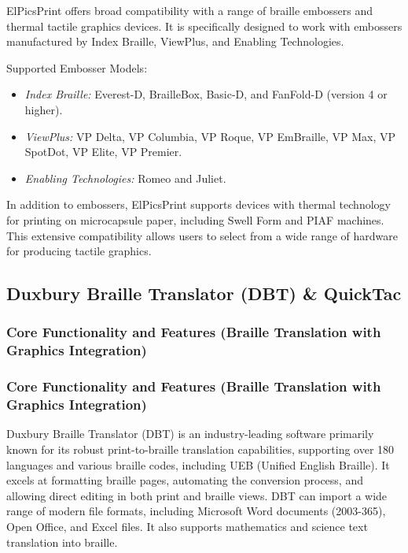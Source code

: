ElPicsPrint offers broad compatibility with a range of braille embossers and thermal tactile graphics devices. It is specifically designed to work with embossers manufactured by Index Braille, ViewPlus, and Enabling Technologies. \cite{TactileViewIrie}

Supported Embosser Models:
\begin{itemize}
    \item \emph{Index Braille:} Everest-D, BrailleBox, Basic-D, and FanFold-D (version 4 or higher). \cite{TactileViewIrie,DuxburyDetails}
    \item \emph{ViewPlus:} VP Delta, VP Columbia, VP Roque, VP EmBraille, VP Max, VP SpotDot, VP Elite, VP Premier. \cite{TactileViewIrie,DuxburyDetails}
    \item \emph{Enabling Technologies:} Romeo and Juliet. \cite{TactileViewIrie,DuxburyDetails}
\end{itemize}

In addition to embossers, ElPicsPrint supports devices with thermal technology for printing on microcapsule paper, including Swell Form and PIAF machines. \cite{TactileViewIrie} This extensive compatibility allows users to select from a wide range of hardware for producing tactile graphics.

\subsection{Duxbury Braille Translator (DBT) \& QuickTac}

\subsubsection{Core Functionality and Features (Braille Translation with Graphics Integration)}

\subsubsection{Core Functionality and Features (Braille Translation with Graphics Integration)}

Duxbury Braille Translator (DBT) is an industry-leading software primarily known for its robust print-to-braille translation capabilities, supporting over 180 languages and various braille codes, including UEB (Unified English Braille). \cite{DuxburyDetails,PerkinsTouchMapper,ViewplusTSS,IrieBrailleTrac,ElitaElPicsPrint,ViewplusTigerSuite} It excels at formatting braille pages, automating the conversion process, and allowing direct editing in both print and braille views. \cite{PerkinsTouchMapper} DBT can import a wide range of modern file formats, including Microsoft Word documents (2003-365), Open Office, and Excel files. \cite{PerkinsTouchMapper,IrieBrailleTrac,ElitaElPicsPrint,ViewplusTigerSuite} It also supports mathematics and science text translation into braille. \cite{PerkinsTouchMapper,ElitaElPicsPrint,ViewplusTigerSuite}

